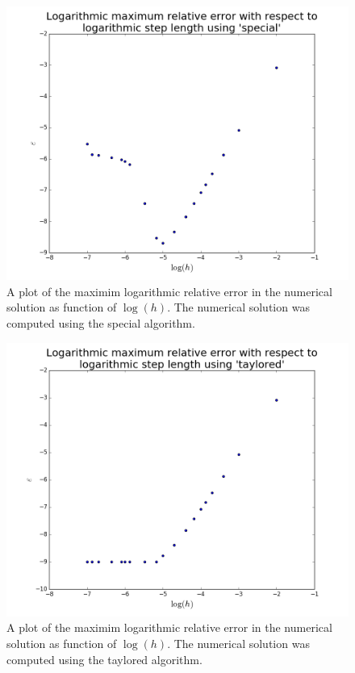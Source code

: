 \documentclass[reprint,english]{revtex4-1}
\begin{document}
\begin{figure}[h!]
\centering
\includegraphics[scale=0.34]{figures/special_maxerror.png}
\caption{A plot of the maximim logarithmic relative error in the numerical solution as function of \(\log(h)\). The numerical solution was computed using the special algorithm.}\label{fig:spe_alg_maxerror}
\end{figure}

\begin{figure}[h!]
\centering
\includegraphics[scale=0.34]{figures/taylored_maxerror.png}
\caption{A plot of the maximim logarithmic relative error in the numerical solution as function of \(\log(h)\). The numerical solution was computed using the taylored algorithm.}\label{fig:tay_alg_maxerror}
\end{figure}
\newpage
\end{document}

